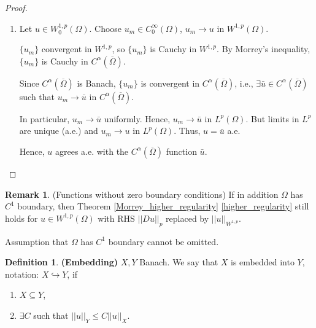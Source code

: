 \documentclass[12pt]{article}
\DeclareMathOperator{\diam}{diam}
\theoremstyle{definition}
\newtheorem*{definition*}{Definition}
\newtheorem*{remark}{Remark}
\begin{document}
\begin{proof}
\begin{enumerate}[label=\alph*)]
\begin{proof}
Fix $x\in\Omega$, pick $y\in\partial\Omega$, use $u(y)=0$.
\[|u(x)|=\big|u(x)-u(y)\big|\leq C|x-y|^{1-\frac{n}{p}}||\nabla u||_{L^p(\Omega)}\leq(\diam\Omega)^{1-\frac{n}{p}}||\nabla u||_{L^p(\Omega)},\]
\[\sup_{\Omega}|u|\leq(\diam\Omega)^{1-\frac{n}{p}}||\nabla u||_{L^p(\Omega)}.\]
\end{proof}

\item Let $u\in W_0^{1,p}(\Omega)$. Choose $u_m\in C_0^{\infty}(\Omega)$, $u_m\rightarrow u$ in $W^{1,p}(\Omega)$.

$\{u_m\}$ convergent in $W^{1,p}$, so $\{u_m\}$ is Cauchy in $W^{1,p}$. By Morrey's inequality, $\{u_m\}$ is Cauchy in $C^{\alpha}(\overline{\Omega})$.

Since $C^{\alpha}(\overline{\Omega})$ is Banach, $\{u_m\}$ is convergent in $C^{\alpha}(\overline{\Omega})$, i.e., $\exists\bar{u}\in C^{\alpha}(\overline{\Omega})$ such that $u_m\rightarrow\bar{u}$ in $C^{\alpha}(\overline{\Omega})$.

In particular, $u_m\rightarrow\bar{u}$ uniformly. Hence, $u_m\rightarrow\bar{u}$ in $L^p(\Omega)$. But limits in $L^p$ are unique (a.e.) and $u_m\rightarrow u$ in $L^p(\Omega)$. Thus, $u=\bar{u}$ a.e.

Hence, $u$ agrees a.e. with the $C^{\alpha}(\overline{\Omega})$ function $\bar{u}$.
\end{enumerate}
\end{proof}

\begin{remark}
(Functions without zero boundary conditions) If in addition $\Omega$ has $C^1$ boundary, then Theorem \ref{Morrey_higher_regularity} \ref{higher_regularity} still holds for $u\in W^{1,p}(\Omega)$ with RHS $||Du||_p$ replaced by $||u||_{W^{1,p}}$.

Assumption that $\Omega$ has $C^1$ boundary cannot be omitted.
\end{remark}

\begin{definition*}
\textbf{(Embedding)} $X,Y$ Banach. We say that $X$ is embedded into $Y$, notation: $X\hookrightarrow Y$, if
\begin{enumerate}[label=(\roman*)]
\item $X\subseteq Y$,
\item $\exists C$ such that $||u||_Y\leq C||u||_X$.
\end{enumerate}
\end{definition*}
\end{document}
